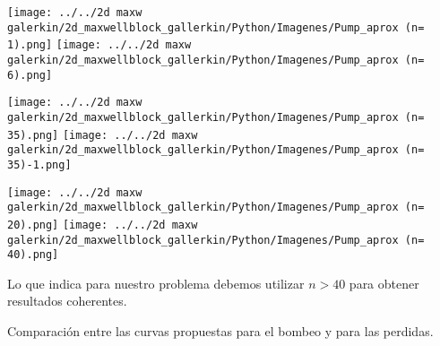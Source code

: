 		\begin{minipage}{0.33\textwidth}
			\begin{center}
				\texttt{[image: ../../2d maxw galerkin/2d\_maxwellblock\_gallerkin/Python/Imagenes/Pump\_aprox (n= 1).png]}
				\texttt{[image: ../../2d maxw galerkin/2d\_maxwellblock\_gallerkin/Python/Imagenes/Pump\_aprox (n= 6).png]}
			\end{center}
		\end{minipage}
		\begin{minipage}{0.33\textwidth}
			\begin{center}
				\texttt{[image: ../../2d maxw galerkin/2d\_maxwellblock\_gallerkin/Python/Imagenes/Pump\_aprox (n= 35).png]}
				\texttt{[image: ../../2d maxw galerkin/2d\_maxwellblock\_gallerkin/Python/Imagenes/Pump\_aprox (n= 35)-1.png]}
			\end{center}
		\end{minipage}
		\begin{minipage}{0.33\textwidth}
			\begin{center}
				\texttt{[image: ../../2d maxw galerkin/2d\_maxwellblock\_gallerkin/Python/Imagenes/Pump\_aprox (n= 20).png]}
				\texttt{[image: ../../2d maxw galerkin/2d\_maxwellblock\_gallerkin/Python/Imagenes/Pump\_aprox (n= 40).png]}
			\end{center}
		\end{minipage}
		
		
		Lo que indica para nuestro problema debemos utilizar $n>40$ para obtener resultados coherentes.	
		
		Comparación entre las curvas propuestas para el bombeo y para las perdidas.
		
%		
%		
%	
		
